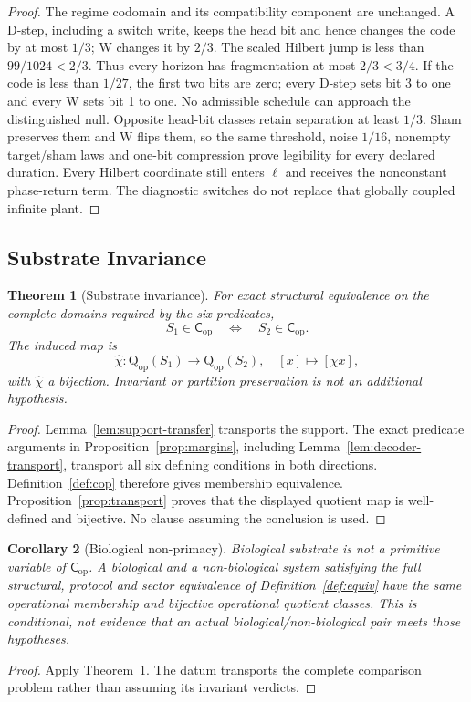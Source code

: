 \documentclass[11pt,a4paper]{article}
\newtheorem{theorem}{Theorem}[section]
\newtheorem{corollary}[theorem]{Corollary}
\theoremstyle{definition}
\newcommand{\Cop}{\mathsf{C}_{\mathrm{op}}}
\newcommand{\Qop}{\mathrm{Q}_{\mathrm{op}}}
\begin{document}
\begin{proof}
The regime codomain and its compatibility component are unchanged. A D-step,
including a switch write, keeps the head bit and hence changes the code by
at most $1/3$; W changes it by $2/3$. The scaled Hilbert jump is less than
$99/1024<2/3$. Thus every horizon has fragmentation at most $2/3<3/4$.
If the code is less than $1/27$, the first two bits are zero; every D-step
sets bit 3 to one and every W sets bit 1 to one. No admissible schedule can
approach the distinguished null. Opposite head-bit classes retain separation
at least $1/3$. Sham preserves them and W flips them, so the same threshold,
noise $1/16$, nonempty target/sham laws and one-bit compression prove legibility
for every declared duration. Every Hilbert coordinate still enters $\ell$
and receives the nonconstant phase-return term. The diagnostic switches do
not replace that globally coupled infinite plant.
\end{proof}

\subsection{Substrate Invariance}
\begin{theorem}[Substrate invariance]\label{thm:substrate}
For exact structural equivalence on the complete domains required by the six predicates,
\[
 S_1\in\Cop\quad\Longleftrightarrow\quad S_2\in\Cop.
\]
The induced map is
\[
 \widehat\chi:\Qop(S_1)\longrightarrow\Qop(S_2),\quad [x]\mapsto[\chi x],
\]
with $\widehat\chi$ a bijection. Invariant or partition preservation is not an additional hypothesis.
\end{theorem}
\begin{proof}
Lemma~\ref{lem:support-transfer} transports the support. The exact predicate arguments in Proposition~\ref{prop:margins}, including Lemma~\ref{lem:decoder-transport}, transport all six defining conditions in both directions. Definition~\ref{def:cop} therefore gives membership equivalence. Proposition~\ref{prop:transport} proves that the displayed quotient map is well-defined and bijective. No clause assuming the conclusion is used.
\end{proof}

\begin{corollary}[Biological non-primacy]\label{cor:biology}
Biological substrate is not a primitive variable of $\Cop$. A biological and a non-biological system satisfying the full structural, protocol and sector equivalence of Definition~\ref{def:equiv} have the same operational membership and bijective operational quotient classes. This is conditional, not evidence that an actual biological/non-biological pair meets those hypotheses.
\end{corollary}
\begin{proof}
Apply Theorem~\ref{thm:substrate}. The datum transports the complete comparison problem rather than assuming its invariant verdicts.
\end{proof}
\end{document}

